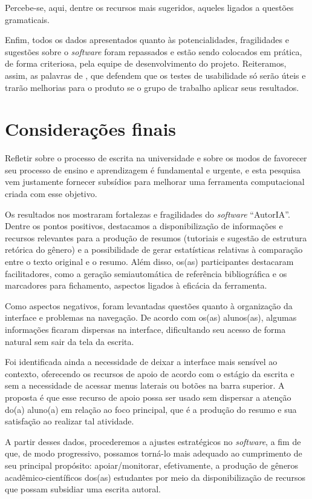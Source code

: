 \documentclass[portuguese]{textolivre}
\begin{document}
Percebe-se, aqui, dentre os recursos mais sugeridos, aqueles ligados a questões gramaticais.

Enfim, todos os dados apresentados quanto às potencialidades, fragilidades e sugestões sobre o \textit{software} foram repassados e estão sendo colocados em prática, de forma criteriosa, pela equipe de desenvolvimento do projeto. Reiteramos, assim, as palavras de \textcite{conrad2002}, que defendem que os testes de usabilidade só serão úteis e trarão melhorias para o produto se o grupo de trabalho aplicar seus resultados.

\section{Considerações finais}\label{sec-organizacao-latex}
Refletir sobre o processo de escrita na universidade e sobre os modos de favorecer seu processo de ensino e aprendizagem é fundamental e urgente, e esta pesquisa vem justamente fornecer subsídios para melhorar uma ferramenta computacional criada com esse objetivo.

Os resultados nos mostraram fortalezas e fragilidades do \textit{software} “AutorIA”. Dentre os pontos positivos, destacamos a disponibilização de informações e recursos relevantes para a produção de resumos (tutoriais e sugestão de estrutura retórica do gênero) e a possibilidade de gerar estatísticas relativas à comparação entre o texto original e o resumo. Além disso, os(as) participantes destacaram facilitadores, como a geração semiautomática de referência bibliográfica e os marcadores para fichamento, aspectos ligados à eficácia da ferramenta.

Como aspectos negativos, foram levantadas questões quanto à organização da interface e problemas na navegação. De acordo com os(as) alunos(as), algumas informações ficaram dispersas na interface, dificultando seu acesso de forma natural sem sair da tela da escrita.

Foi identificada ainda a necessidade de deixar a interface mais sensível ao contexto, oferecendo os recursos de apoio de acordo com o estágio da escrita e sem a necessidade de acessar menus laterais ou botões na barra superior. A proposta é que esse recurso de apoio possa ser usado sem dispersar a atenção do(a) aluno(a) em relação ao foco principal, que é a produção do resumo e sua satisfação ao realizar tal atividade.

A partir desses dados, procederemos a ajustes estratégicos no \textit{software}, a fim de que, de modo progressivo, possamos torná-lo mais adequado ao cumprimento de seu principal propósito: apoiar/monitorar, efetivamente, a produção de gêneros acadêmico-científicos dos(as) estudantes por meio da disponibilização de recursos que possam subsidiar uma escrita autoral.
\end{document}
